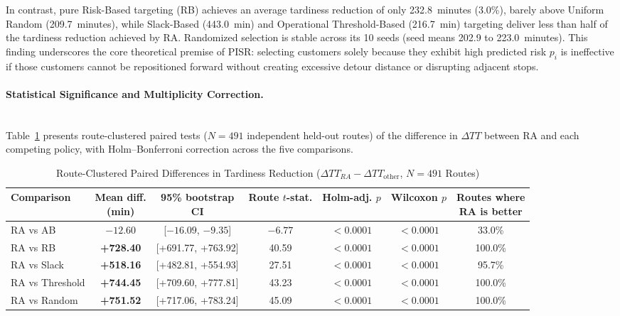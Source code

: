 \documentclass[11pt,a4paper]{article}
\begin{document}
In contrast, pure Risk-Based targeting (RB) achieves an average tardiness reduction of only 232.8~minutes (3.0\%), barely above Uniform Random (209.7~minutes), while Slack-Based (443.0~min) and Operational Threshold-Based (216.7~min) targeting deliver less than half of the tardiness reduction achieved by RA. Randomized selection is stable across its 10 seeds (seed means 202.9 to 223.0~minutes). This finding underscores the core theoretical premise of PISR: selecting customers solely because they exhibit high predicted risk $p_i$ is ineffective if those customers cannot be repositioned forward without creating excessive detour distance or disrupting adjacent stops.

\paragraph{Statistical Significance and Multiplicity Correction.}\mbox{}\\
Table~\ref{tab:statistical-tests} presents route-clustered paired tests ($N = 491$ independent held-out routes) of the difference in $\Delta TT$ between RA and each competing policy, with Holm--Bonferroni correction across the five comparisons.

\begin{table}[htbp]
\centering
\caption{Route-Clustered Paired Differences in Tardiness Reduction ($\Delta TT_{RA} - \Delta TT_{\text{other}}$, $N = 491$ Routes)}
\label{tab:statistical-tests}
\scriptsize
\setlength{\tabcolsep}{3pt}
\renewcommand{\arraystretch}{1.15}
\begin{tabular}{lcccccc}
\toprule
\textbf{Comparison} & \shortstack{\textbf{Mean diff.}\\\textbf{(min)}} & \shortstack{\textbf{95\% bootstrap}\\\textbf{CI}} & \shortstack{\textbf{Route}\\\textbf{$t$-stat.}} & \shortstack{\textbf{Holm-adj.}\\\textbf{$p$}} & \shortstack{\textbf{Wilcoxon}\\\textbf{$p$}} & \shortstack{\textbf{Routes where}\\\textbf{RA is better}} \\
\midrule
RA vs AB & $-12.60$ & [$-16.09$, $-9.35$] & $-6.77$ & $<0.0001$ & $<0.0001$ & 33.0\% \\
RA vs RB & \textbf{+728.40} & [+691.77, +763.92] & 40.59 & $<0.0001$ & $<0.0001$ & 100.0\% \\
RA vs Slack & \textbf{+518.16} & [+482.81, +554.93] & 27.51 & $<0.0001$ & $<0.0001$ & 95.7\% \\
RA vs Threshold & \textbf{+744.45} & [+709.60, +777.81] & 43.23 & $<0.0001$ & $<0.0001$ & 100.0\% \\
RA vs Random & \textbf{+751.52} & [+717.06, +783.24] & 45.09 & $<0.0001$ & $<0.0001$ & 100.0\% \\
\bottomrule
\end{tabular}
\end{table}
\end{document}
